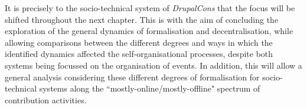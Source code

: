 It is precisely to the socio-technical system of \textit{DrupalCons} that the focus will be shifted throughout the next chapter. This is with the aim of concluding the exploration of the general dynamics of formalisation and decentralisation, while allowing comparisons between the different degrees and ways in which the identified dynamics affected the self-organisational processes, despite both systems being focussed on the organisation of events. In addition, this will allow a general analysis considering these different degrees of formalisation for socio-technical systems along the ``mostly-online/mostly-offline" spectrum of contribution activities.